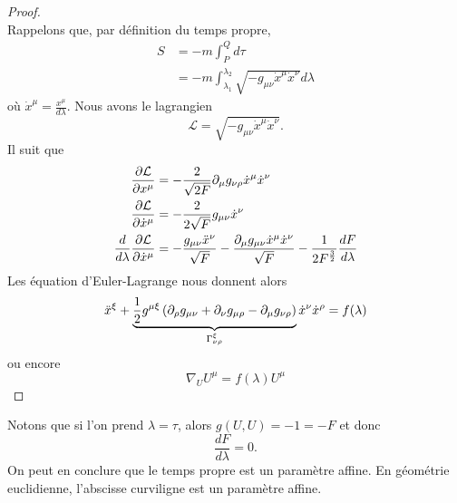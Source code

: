 \documentclass[a4paper,11pt]{report}
\begin{document}
            \begin{proof}${}$\\
                Rappelons que, par définition du temps propre,
                \begin{align}
                    S &= -m\int_P^Q d\tau\\
                    &= -m\int_{\lambda_1}^{\lambda_2}\sqrt{-g_{\mu\nu}\dot{x}^\mu\dot{x}^\nu}d\lambda
                \end{align}
                où $\dot{x}^\mu = \frac{x^\mu}{d\lambda}$. Nous avons le lagrangien
                \begin{equation}
                    \mathcal{L} = \sqrt{-g_{\mu\nu}\dot{x}^\mu\dot{x}^\nu}.
                \end{equation}
                Il suit que
                \begin{align}
                    \pdv{\mathcal{L}}{x^\mu} &= -\frac{2}{\sqrt{2F}}\partial_\mu g_{\nu\rho}\dot{x}^\mu\dot{x}^\nu \\
                    \pdv{\mathcal{L}}{\dot{x}^\mu} &= -\frac{2}{2\sqrt{F}}g_{\mu\nu}\dot{x}^\nu\\
                    \frac{d}{d\lambda}\pdv{\mathcal{L}}{\dot{x}^\mu} &= -\frac{g_{\mu\nu}\ddot{x}^\nu}{\sqrt{F}}-\frac{\partial_\mu g_{\mu\nu} \dot{x}^\mu\dot{x}^\nu}{\sqrt{F}}-\frac{1}{2F^{\frac{3}{2}}}\frac{dF}{d\lambda}
                \end{align}
                Les équation d'Euler-Lagrange nous donnent alors
                \begin{equation}
                    \ddot{x}^\xi + \underbrace{\frac{1}{2}g^{\mu\xi}\left( \partial_\rho g_{\mu\nu}+\partial_\nu g_{\mu\rho} - \partial_\mu g_{\nu\rho} \right)}_{\Gamma^\xi_{\nu\rho}}\dot{x}^\nu\dot{x}^\rho = f(\lambda)
                \end{equation}
                ou encore
                \begin{equation}
                    \nabla_U U^\mu = f(\lambda)U^\mu
                \end{equation}
            \end{proof}
            
            Notons que si l'on prend $\lambda = \tau$, alors $g(U,U) = -1 = -F$ et donc
            \begin{equation}
                \frac{dF}{d\lambda} = 0.
            \end{equation}
            On peut en conclure que le temps propre est un paramètre affine. En géométrie euclidienne, l'abscisse curviligne est un paramètre affine.
            
\end{document}
